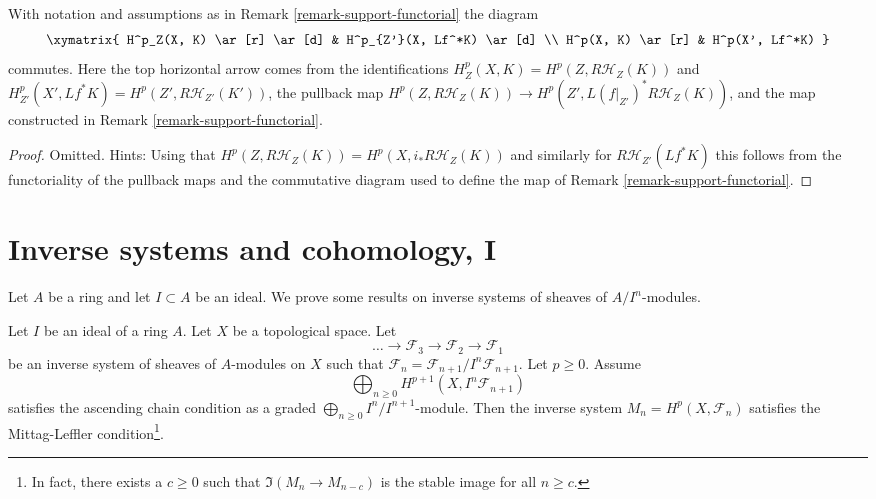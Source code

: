 \begin{lemma}
\label{lemma-support-functorial}
With notation and assumptions as in Remark \ref{remark-support-functorial}
the diagram
$$
\xymatrix{
H^p_Z(X, K) \ar[r] \ar[d] & H^p_{Z'}(X, Lf^*K) \ar[d] \\
H^p(X, K) \ar[r] & H^p(X', Lf^*K)
}
$$
commutes. Here the top horizontal arrow comes from the identifications
$H^p_Z(X, K) = H^p(Z, R\mathcal{H}_Z(K))$ and
$H^p_{Z'}(X', Lf^*K) = H^p(Z', R\mathcal{H}_{Z'}(K'))$,
the pullback map
$H^p(Z, R\mathcal{H}_Z(K)) \to H^p(Z', L(f|_{Z'})^*R\mathcal{H}_Z(K))$,
and the map constructed in Remark \ref{remark-support-functorial}.
\end{lemma}

\begin{proof}
Omitted. Hints:
Using that $H^p(Z, R\mathcal{H}_Z(K)) = H^p(X, i_*R\mathcal{H}_Z(K))$
and similarly for $R\mathcal{H}_{Z'}(Lf^*K)$ this follows from
the functoriality of the pullback maps and the commutative diagram
used to define the map of Remark \ref{remark-support-functorial}.
\end{proof}






\section{Inverse systems and cohomology, I}
\label{section-inverse-systems}

\noindent
Let $A$ be a ring and let $I \subset A$ be an ideal.
We prove some results on inverse systems of sheaves of $A/I^n$-modules.

\begin{lemma}
\label{lemma-ML-general}
Let $I$ be an ideal of a ring $A$. Let $X$ be a topological space.
Let
$$
\ldots \to \mathcal{F}_3 \to \mathcal{F}_2 \to \mathcal{F}_1
$$
be an inverse system of sheaves of $A$-modules on $X$
such that $\mathcal{F}_n = \mathcal{F}_{n + 1}/I^n\mathcal{F}_{n + 1}$.
Let $p \geq 0$. Assume
$$
\bigoplus\nolimits_{n \geq 0} H^{p + 1}(X, I^n\mathcal{F}_{n + 1})
$$
satisfies the ascending chain condition as a graded
$\bigoplus_{n \geq 0} I^n/I^{n + 1}$-module.
Then the inverse system $M_n = H^p(X, \mathcal{F}_n)$ satisfies the
Mittag-Leffler condition\footnote{In fact, there exists
a $c \geq 0$ such that $\Im(M_n \to M_{n - c})$ is the stable image
for all $n \geq c$.}.
\end{lemma}


